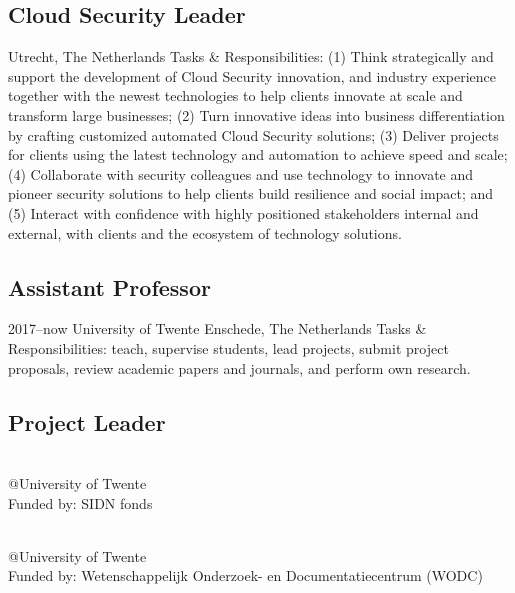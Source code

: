\documentclass[print]{styles/friggeri-cv-mac} %
\begin{document}
\subsection{Cloud Security Leader}\vspace{-5pt}
\begin{entrylist}
{Utrecht, The Netherlands}
{Tasks \& Responsibilities: (1) Think strategically and support the development of Cloud Security innovation, and industry experience together with the newest technologies to help clients innovate at scale and transform large businesses; (2) Turn innovative ideas into business differentiation by crafting customized automated Cloud Security solutions; (3) Deliver projects for clients using the latest technology and automation to achieve speed and scale; (4) Collaborate with security colleagues and use technology to innovate and pioneer security solutions to help clients build resilience and social impact; and (5) Interact with confidence with highly positioned stakeholders internal and external, with clients and the ecosystem of technology solutions.}
\end{entrylist}
\subsection{Assistant Professor}\vspace{-5pt}
\begin{entrylist}
	\entry
	{2017--now}
	{University of Twente}
	{Enschede, The Netherlands}
	{Tasks \& Responsibilities: teach, supervise students, lead projects, submit project proposals, review academic papers and journals, and perform own research.} 
\end{entrylist}
\newpage
\subsection{Project Leader}\vspace{-5pt}
\begin{entrylist}

{\\@University of Twente\\Funded by: SIDN fonds}%
{}

{\\@University of Twente\\Funded by: Wetenschappelijk Onderzoek- en Documentatiecentrum (WODC)}%
{}
\end{entrylist}
\end{document}
